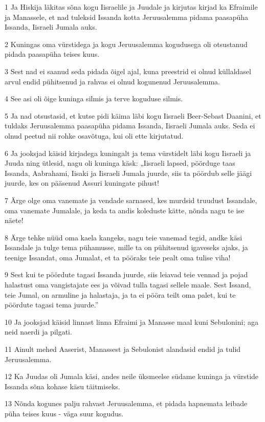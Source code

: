 \par 1 Ja Hiskija läkitas sõna kogu Iisraelile ja Juudale ja kirjutas kirjad ka Efraimile ja Manassele, et nad tuleksid Issanda kotta Jeruusalemma pidama paasapüha Issanda, Iisraeli Jumala auks.
\par 2 Kuningas oma vürstidega ja kogu Jeruusalemma kogudusega oli otsustanud pidada paasapüha teises kuus.
\par 3 Sest nad ei saanud seda pidada õigel ajal, kuna preestrid ei olnud küllaldasel arvul endid pühitsenud ja rahvas ei olnud kogunenud Jeruusalemma.
\par 4 See asi oli õige kuninga silmis ja terve koguduse silmis.
\par 5 Ja nad otsustasid, et kutse pidi käima läbi kogu Iisraeli Beer-Sebast Daanini, et tuldaks Jeruusalemma paasapüha pidama Issanda, Iisraeli Jumala auks. Seda ei olnud peetud nii rohke osavõtuga, kui oli ette kirjutatud.
\par 6 Ja jooksjad käisid kirjadega kuningalt ja tema vürstidelt läbi kogu Iisraeli ja Juuda ning ütlesid, nagu oli kuninga käsk: „Iisraeli lapsed, pöörduge taas Issanda, Aabrahami, Iisaki ja Iisraeli Jumala juurde, siis ta pöördub selle jäägi juurde, kes on pääsenud Assuri kuningate pihust!
\par 7 Ärge olge oma vanemate ja vendade sarnased, kes murdsid truudust Issandale, oma vanemate Jumalale, ja keda ta andis koleduste kätte, nõnda nagu te ise näete!
\par 8 Ärge tehke nüüd oma kaela kangeks, nagu teie vanemad tegid, andke käsi Issandale ja tulge tema pühamusse, mille ta on pühitsenud igaveseks ajaks, ja teenige Issandat, oma Jumalat, et ta pööraks teie pealt oma tulise viha!
\par 9 Sest kui te pöördute tagasi Issanda juurde, siis leiavad teie vennad ja pojad halastust oma vangistajate ees ja võivad tulla tagasi sellele maale. Sest Issand, teie Jumal, on armuline ja halastaja, ja ta ei pööra teilt oma palet, kui te pöördute tagasi tema juurde.”
\par 10 Ja jooksjad käisid linnast linna Efraimi ja Manasse maal kuni Sebulonini; aga neid naerdi ja pilgati.
\par 11 Ainult mehed Aaserist, Manassest ja Sebulonist alandasid endid ja tulid Jeruusalemma.
\par 12 Ka Juudas oli Jumala käsi, andes neile üksmeelse südame kuninga ja vürstide Issanda sõna kohase käsu täitmiseks.
\par 13 Nõnda kogunes palju rahvast Jeruusalemma, et pidada hapnemata leibade püha teises kuus - väga suur kogudus.
